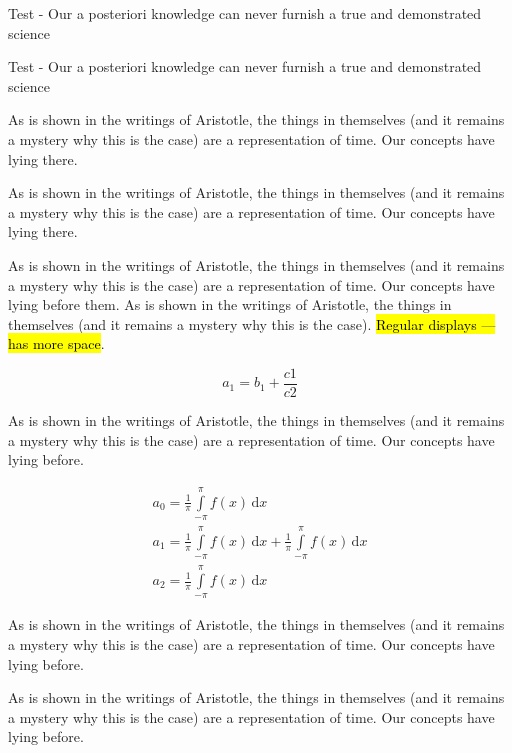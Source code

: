 \documentclass[12pt,chapterrefs]{ndsu-thesis-2022}
\begin{document}

Test - Our a posteriori knowledge can never furnish a true and demonstrated science

Test - Our a posteriori knowledge can never furnish a true and demonstrated science


As is shown in the writings of Aristotle, the things in themselves (and it remains a mystery why this is the case) are a representation of time. Our concepts have lying there.


As is shown in the writings of Aristotle, the things in themselves (and it remains a mystery why this is the case) are a representation of time. Our concepts have lying there. 


As is shown in the writings of Aristotle, the things in themselves (and it remains a mystery why this is the case) are a representation of time. Our concepts have lying before them. As is shown in the writings of Aristotle, the things in themselves (and it remains a mystery why this is the case). \hl{Regular displays --- has more space}.

\[
a_1 =b_1+\frac{c1}{c2} 
\]

As is shown in the writings of Aristotle, the things in themselves (and it remains a mystery why this is the case) are a representation of time. Our concepts have lying before.

\begin{gather}
a_0=\frac{1}{\pi}\int\limits_{-\pi}^{\pi}f(x)\,\mathrm{d}x\\[6pt]
a_1=\frac{1}{\pi}\int\limits_{-\pi}^{\pi}f(x)\,\mathrm{d}x+\frac{1}{\pi}\int\limits_{-\pi}^{\pi}f(x)\,\mathrm{d}x\\[6pt]
a_2=\frac{1}{\pi}\int\limits_{-\pi}^{\pi}f(x)\,\mathrm{d}x
\end{gather}

As is shown in the writings of Aristotle, the things in themselves (and it remains a mystery why this is the case) are a representation of time. Our concepts have lying before.

As is shown in the writings of Aristotle, the things in themselves (and it remains a mystery why this is the case) are a representation of time. Our concepts have lying before.
\end{document}
